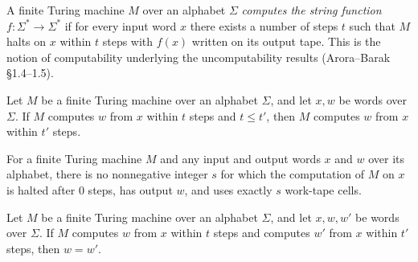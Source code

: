 \begin{definition}
\label{Turing.FinTM.Computes}
\leanok
{}
A finite Turing machine $M$ over an alphabet $\Sigma$ \emph{computes the
string function $f \colon \Sigma^{*} \to \Sigma^{*}$} if for every input word
$x$ there exists a number of steps $t$ such that $M$ halts on $x$ within $t$
steps with $f(x)$ written on its output tape.  This is the notion of
computability underlying the uncomputability results
(Arora--Barak \S 1.4--1.5).
\end{definition}

\begin{theorem}
\label{Turing.FinTM.ComputesInTime.mono}
\leanok
{}
Let $M$ be a finite Turing machine over an alphabet $\Sigma$, and let $x,w$ be words
over $\Sigma$. If $M$ computes $w$ from $x$ within $t$ steps and $t \le t'$, then $M$
computes $w$ from $x$ within $t'$ steps.
\end{theorem}

\begin{theorem}
\label{Turing.FinTM.not_computesInTime_zero}
\leanok
{}
For a finite Turing machine $M$ and any input and output words $x$ and $w$ over its
alphabet, there is no nonnegative integer $s$ for which the computation of $M$ on $x$ is
halted after $0$ steps, has output $w$, and uses exactly $s$ work-tape cells.
\end{theorem}

\begin{theorem}
\label{Turing.FinTM.ComputesInTime.output_unique}
\leanok
{}
Let $M$ be a finite Turing machine over an alphabet $\Sigma$, and let $x,w,w'$ be words
over $\Sigma$. If $M$ computes $w$ from $x$ within $t$ steps and computes $w'$ from $x$
within $t'$ steps, then $w=w'$.
\end{theorem}

